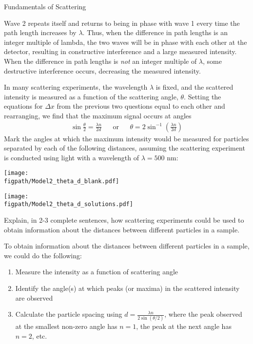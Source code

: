 \begin{activity}{Fundamentals of Scattering}
\begin{ctqs}
		\begin{solution}[1.5in]{}
			Wave 2 repeats itself and returns to being in phase with wave 1 every time the path length increases by $\lambda$.  Thus, when the difference in path lengths is an integer multiple of lambda, the two waves will be in phase with each other at the detector, resulting in constructive interference and a large measured intensity.  When the difference in path lengths is \textit{not} an integer multiple of $\lambda$, some destructive interference occurs, decreasing the measured intensity. 
		\end{solution}
	
	\question In many scattering experiments, the wavelength $\lambda$ is fixed, and the scattered intensity is measured as a function of the scattering angle, $\theta$.  Setting the equations for $\Delta x$ from the previous two questions equal to each other and rearranging, we find that the maximum signal occurs at angles
		\begin{align*}
			\sin \frac{\theta}{2} = \frac{\lambda n}{2d} && \text{or} && \theta = 2\sin^{-1}\left(\frac{\lambda n}{2d}\right)
		\end{align*}
		Mark the angles at which the maximum intensity would be measured for particles separated by each of the following distances, assuming the scattering experiment is conducted using light with a wavelength of $\lambda=500\text{ nm}$: \label{\labelbase:ctq:scattangles}
		
		\begin{solution}[1.5in]{
			\centerline{\texttt{[image: \\figpath/Model2\_theta\_d\_blank.pdf]}}
		}
			\centerline{\texttt{[image: \\figpath/Model2\_theta\_d\_solutions.pdf]}}
		\end{solution}
		
	\question Explain, in 2-3 complete sentences, how scattering experiments could be used to obtain information about the distances between different particles in a sample.
	
		\begin{solution}[2in]{}
			To obtain information about the distances between different particles in a sample, we could do the following:
			\begin{enumerate}
				\item Measure the intensity as a function of scattering angle
				\item Identify the angle(s) at which peaks (or maxima) in the scattered intensity are observed
				\item Calculate the particle spacing using $d = \frac{\lambda n}{2\sin(\theta/2)}$, where the peak observed at the smallest non-zero angle has $n=1$, the peak at the next angle has $n=2$, etc.
			\end{enumerate}
		\end{solution}
	

\end{ctqs}
\end{activity}
